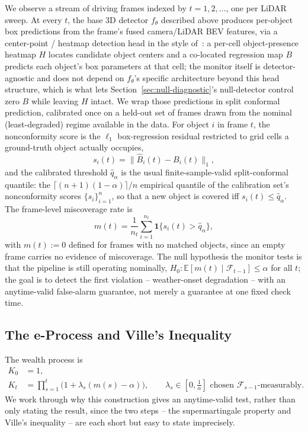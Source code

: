 We observe a stream of driving frames indexed by $t = 1, 2, \ldots$, one per LiDAR sweep. At every $t$, the base 3D detector $f_\theta$ described above produces per-object box predictions from the frame's fused camera/LiDAR BEV features, via a center-point / heatmap detection head in the style of~\cite{Zhou2019ObjectsAsPoints,Yin2021CenterPoint}: a per-cell object-presence heatmap $H$ locates candidate object centers and a co-located regression map $B$ predicts each object's box parameters at that cell; the monitor itself is detector-agnostic and does not depend on $f_\theta$'s specific architecture beyond this head structure, which is what lets Section~\ref{sec:null-diagnostic}'s null-detector control zero $B$ while leaving $H$ intact. We wrap those predictions in split conformal prediction, calibrated once on a held-out set of frames drawn from the nominal (least-degraded) regime available in the data. For object $i$ in frame $t$, the nonconformity score is the $\ell_1$ box-regression residual restricted to grid cells a ground-truth object actually occupies,
\[
s_i(t) = \big\| \hat{B}_i(t) - B_i(t) \big\|_1 ,
\]
and the calibrated threshold $\hat{q}_\alpha$ is the usual finite-sample-valid split-conformal quantile: the $\lceil (n+1)(1-\alpha) \rceil / n$ empirical quantile of the calibration set's nonconformity scores $\{s_i\}_{i=1}^{n}$, so that a new object is covered iff $s_i(t) \le \hat{q}_\alpha$. The frame-level miscoverage rate is
\[
m(t) = \frac{1}{n_t} \sum_{i=1}^{n_t} \mathbf{1}\{s_i(t) > \hat{q}_\alpha\},
\]
with $m(t) := 0$ defined for frames with no matched objects, since an empty frame carries no evidence of miscoverage. The null hypothesis the monitor tests is that the pipeline is still operating nominally, $H_0: \mathbb{E}[m(t) \mid \mathcal{F}_{t-1}] \le \alpha$ for all $t$; the goal is to detect the first violation -- weather-onset degradation -- with an anytime-valid false-alarm guarantee, not merely a guarantee at one fixed check time.

\subsection{The e-Process and Ville's Inequality}
\label{sec:eprocess}

The wealth process is
\begin{align}
K_0 &= 1, \nonumber \\
K_t &= \prod_{s=1}^{t} \big(1 + \lambda_s (m(s) - \alpha)\big), \qquad \lambda_s \in \left[0, \tfrac{1}{\alpha}\right] \text{ chosen } \mathcal{F}_{s-1}\text{-measurably.}
\label{eq:wealth}
\end{align}
We work through why this construction gives an anytime-valid test, rather than only stating the result, since the two steps -- the supermartingale property and Ville's inequality -- are each short but easy to state imprecisely.

